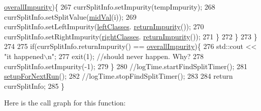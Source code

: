 \begin{DoxyCode}
      \hyperlink{classfp_1_1split_a1eba74d8afed2852da3eb004afe76bb7}{overallImpurity})\{
267                                 currSplitInfo.setImpurity(tempImpurity);
268                                 currSplitInfo.setSplitValue(\hyperlink{classfp_1_1split_a0a8bc35b7ff78cb96332cdbda12b5fe5}{midVal}(i));
269                                 currSplitInfo.setLeftImpurity(\hyperlink{classfp_1_1split_a3be6dcf32281715e6376e9f5f8da18f0}{leftClasses}.
      \hyperlink{classfp_1_1classTotals_a82993575e2ad13f057f01050a52ef4ce}{returnImpurity}());
270                                 currSplitInfo.setRightImpurity(\hyperlink{classfp_1_1split_af5366297f7de9b8ff0911186300bab7e}{rightClasses}.
      \hyperlink{classfp_1_1classTotals_a82993575e2ad13f057f01050a52ef4ce}{returnImpurity}());
271                             \}
272                         \}
273                     \}
274 
275                     \textcolor{keywordflow}{if}(currSplitInfo.returnImpurity() == \hyperlink{classfp_1_1split_a1eba74d8afed2852da3eb004afe76bb7}{overallImpurity})\{
276                         std::cout << \textcolor{stringliteral}{"it happened\(\backslash\)n"};
277 exit(1); \textcolor{comment}{//should never happen.  Why?}
278                                 currSplitInfo.setImpurity(-1);
279                     \}
280                     \textcolor{comment}{//logTime.startFindSplitTimer();}
281                     \hyperlink{classfp_1_1split_a5ccfceb36e8ea567816af95bb4ae4fea}{setupForNextRun}();
282                     \textcolor{comment}{//logTime.stopFindSplitTimer();}
283 
284                     \textcolor{keywordflow}{return} currSplitInfo;
285                 \}
\end{DoxyCode}
Here is the call graph for this function\+:\nopagebreak
